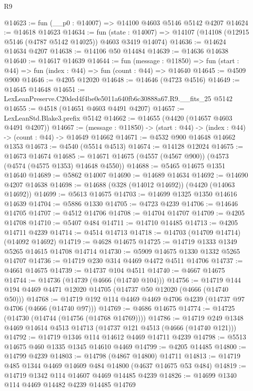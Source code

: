 \begin{lexlean}{R9}
\begin{coremodule}
@14623 := fun (__p0 : @14007) => @14100 @4603 @5146 @5142 @4207
@14624 := @14618 @14623
@14634 := fun (state : @14007) =>
  @14107 (@14108 (@12915 @5146 (@4787 @5142 @14025)) @4603 @3419 @14074)
@14636 := @14624 @14634 @4207
@14638 := @14106 @50 @14484
@14639 := @14636 @14638
@14640 := @14617 @14639
@14644 := fun (message : @11850) =>
  fun (start : @44) => fun (index : @44) => fun (count : @44) => @14640
@14645 := @4509 @900
@14646 := @4205 @12020
@14648 := @14646 (@4723 @4516)
@14649 := @14645 @14648
@14651 := LexLeanPreserve.C20ded4f4be0e5011a640fb6c30888a67.R9.__fits_25 @5142
@14655 := @4518 (@14651 @4603 @4491 @4207)
@14657 := LexLeanStd.Blake3.prefix @5142
@14662 := @14655 (@4420 (@14657 @4603 @4491 @4207))
@14667 := (message : @11850) -> (start : @44) -> (index : @44) -> (count : @44) -> @14649 @14662
@14671 := @4532 @900 @14648 @14662 @1353
@14673 := @4540 (@5514 @4513)
@14674 := @14128 @12024
@14675 := @14673 @14674
@14685 := @14671 @14675 (@4557 (@4567 @900)) (@4573 (@4574 (@4575 @1353) @14648 @4550))
@14688 := @5465 @14675 @1351 @14640
@14689 := @5862 @14007
@14690 := @14689 @14634
@14692 := @14690 @4207 @14638
@14698 := @14688 (@328 (@14012 @14692)) (@4420 (@14063 @14692))
@14699 := @5613 @14675
@14703 := @14699 @1325 @1350 @14616 @14639
@14704 := @5886 @1330
@14705 := @4723 @4239
@14706 := @14646 @14705
@14707 := @4512 @14706
@14708 := @14704 @14707
@14709 := @4205 @14708
@14710 := @5407 @484
@14711 := @14710 @14485
@14713 := @4205 @14711 @4239
@14714 := @4514 @14713
@14718 := @14703 (@14709 @14714) (@14092 @14692)
@14719 := @4628 @14675
@14725 := @14719 @1333 @1349 @5265 @14615 @14708 @14714
@14730 := @5909 @14675 @1330 @1332 @5265 @14707
@14736 := @14719 @230 @314 @4469 @4472 @4511 @14706
@14737 := @4661 @14675
@14739 := @14737 @104 @4511
@14740 := @4667 @14675
@14744 := @14736 (@14739 (@4666 (@14740 @104)))
@14756 := @14719 @144 @194 @4469 @4471 @12020 @14705 (@14737 @50 @12020 (@4666 (@14740 @50)))
@14768 := @14719 @192 @114 @4469 @4469 @4706 @4239 (@14737 @97 @4706 (@4666 (@14740 @97)))
@14769 := @4686 @14675
@14774 := @14725 (@14730 (@14744 (@14756 (@14768 @14769))))
@14786 := @14719 @249 @1348 @4469 @14614 @4513 @14713 (@14737 @121 @4513 (@4666 (@14740 @121)))
@14792 := @14719 @1346 @114 @14612 @4469 @14711 @4239
@14798 := @5513 @14675 @460 @1335 @1345 @14610 @4469
@14799 := @4205 @14485
@14800 := @14799 @4239
@14803 := @14798 (@4867 @14800) @14711
@14813 := @14719 @485 @1344 @4469 @14609 @484 @14800 (@4637 @14675 @53 @484)
@14819 := @14719 @1342 @114 @14607 @4469 @14485 @4239
@14826 := @14699 @1340 @114 @4469 @14482 @4239 @14485 @14769

\end{coremodule}
\end{lexlean}
